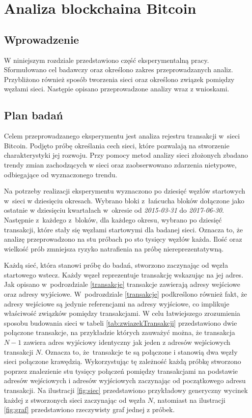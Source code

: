 \documentclass[12pt, twoside, final, openany]{mgr}
\begin{document}
\chapter{Analiza blockchaina Bitcoin}

\section{Wprowadzenie}

\indent W niniejszym rozdziale przedstawiono część eksperymentalną pracy. Sformułowano cel badawczy oraz określono zakres przeprowadzanych analiz. Przybliżono również sposób tworzenia sieci oraz określono związek pomiędzy węzłami sieci. Następie opisano przeprowadzone analizy wraz z wnioskami.

\section{Plan badań}

\indent Celem przeprowadzanego eksperymentu jest analiza rejestru transakcji w~sieci Bitcoin. Podjęto próbę określania cech sieci, które pozwalają na stworzenie charakterystyki jej rozwoju. Przy pomocy metod analizy sieci złożonych zbadano trendy zmian zachodzących w sieci oraz zaobserwowano zdarzenia nietypowe, odbiegające od wyznaczonego trendu. 

\indent Na potrzeby realizacji eksperymentu wyznaczono po dziesięć węzłów startowych w~sieci w dziesięciu okresach. Wybrano bloki z~łańcucha bloków dołączone jako ostatnie w dziesięciu kwartałach w~okresie od \textit{2015-03-31} do \textit{2017-06-30}. Następnie z~każdego z~bloków, dla każdego okresu, wybrano po dziesięć transakcji, które stały się węzłami startowymi dla badanej sieci. Oznacza to, że analizę przeprowadzono na stu próbach po sto tysięcy węzłów każda. Ilość oraz wielkość prób zmniejsza ryzyko natrafienia na próbę niereprezentatywną.

\indent Każdą sieć, która stanowi próbę do badań, stworzono zaczynając od węzła startowego wstecz. Każdy węzeł reprezentuje transakcję wskazując na jej adres. Jak opisano w~podrozdziale \ref{transakcje} transakcje zawierają adresy wejściowe oraz adresy wyjściowe. W~podrozdziale \ref{transakcje} podkreślono również fakt, że adresy wejściowe są jedynie referencjami na adresy wyjściowe, co implikuje właściwość związków pomiędzy transakcjami. W celu łatwiejszego zrozumienia sposobu budowania sieci w tabeli \ref{tab:zwiazekTransakcji} przedstawiono dwie połączone transakcje, na przykładzie których zauważyć można, że transakcja $N-1$ zawiera adres wyjściowy identyczny jak jeden z adresów wejściowych transakcji $N$. Oznacza to, że~transakcje te są połączone i stanowią dwa węzły sieci połączone krawędzią. Wykorzystując tę zależność każdą próbkę stworzono poprzez znalezienie stu tysięcy połączeń pomiędzy transakcjami na podstawie adresów wejściowych i adresów wyjściowych zaczynając od początkowego adresu transakcji. Na ilustracji \ref{fig:siec} przedstawiono przykładowy generyczny wycinek każdej z stworzonych sieci zaczynając od węzła $N$, natomiast na ilustracji \ref{fig:graf} przedstawiono rzeczywisty graf jednej z próbek.
\end{document}
